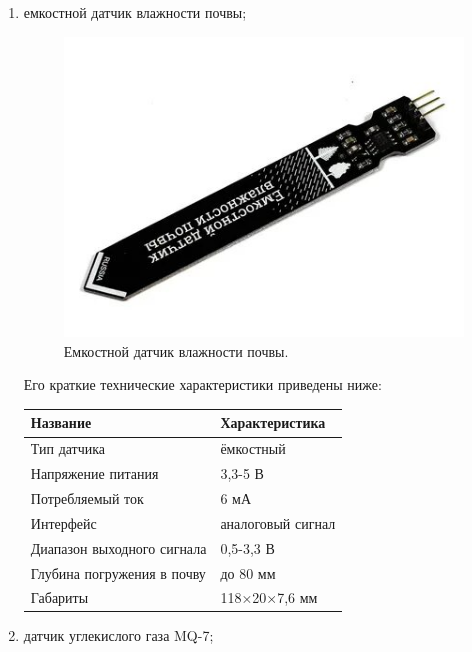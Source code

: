 \begin{enumerate}
    \item емкостной датчик влажности почвы;

    \begin{figure}[H]
        \centering
        \includegraphics[scale=0.6]{images/wet.jpg}
        \caption{Емкостной датчик влажности почвы.}
        \label{fig:wet}
    \end{figure}
    
    Его краткие технические характеристики приведены ниже:

    \begin{table}[H]
        \centering
        \begin{tabular}{|p{6.5cm}|p{6.5cm}|}
            \hline
            Название & Характеристика \\
            \hline
            Тип датчика & ёмкостный \\
            \hline
            Напряжение питания & 3,3-5 В \\
            \hline
            Потребляемый ток & 6 мА \\
            \hline
            Интерфейс & аналоговый сигнал \\
            \hline
            Диапазон выходного сигнала & 0,5-3,3 В \\
            \hline
            Глубина погружения в почву & до 80 мм \\
            \hline
            Габариты & 118×20×7,6 мм \\
            \hline
        \end{tabular}
        \label{tab:wet}
    \end{table}

    \item датчик углекислого газа MQ-7;


\end{enumerate}
